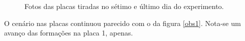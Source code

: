 \documentclass[12pt, titlepage]{article}
\begin{document}
\begin{figure}[H]
	\captionsetup[subfigure]{justification=centering}
	\centering
	\ContinuedFloat

	\caption{Fotos das placas tiradas no sétimo e último dia do experimento.}
\end{figure}

O cenário nas placas continuou parecido com o da figura \ref{obs1}. Nota-se um avanço das formações na placa 1, apenas.
\end{document}
